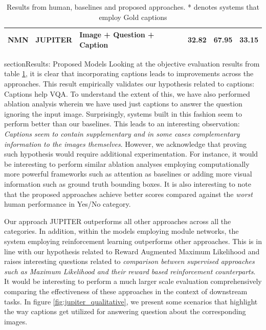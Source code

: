 \begin{table}[!h]
\begin{tabular}{@{}lllccc@{}}
NMN & JUPITER     & Image + Question + Caption &  32.82                 &       	67.95	            &      33.15                   \\\bottomrule
\end{tabular}
\caption{Results from human, baselines and proposed approaches. * denotes systems that employ Gold captions}
\label{results_table}
\end{table}

section{Results: Proposed Models}
Looking at the objective evaluation results from table \ref{results_table}, it is clear that incorporating captions leads to improvements across the approaches. This result empirically validates our hypothesis related to captions: Captions help VQA. To understand the extent of this, we have also performed ablation analysis wherein we have used just captions to answer the question ignoring the input image. Surprisingly, systems built in this fashion seem to perform better than our baselines. This leads to an interesting observation: \textit{Captions seem to contain supplementary and in some cases complementary information to the images themselves}. However, we acknowledge that proving such hypothesis would require additional experimentation. For instance, it would be interesting to perform similar ablation analyses employing computationally more powerful frameworks such as attention as baselines or adding more visual information such as ground truth bounding boxes. It is also interesting to note that the proposed approaches achieve better scores compared against the \textit{worst} human performance in Yes/No category.

Our approach JUPITER outperforms all other approaches across all the categories. In addition, within the models employing module networks, the system employing reinforcement learning outperforms other approaches. This is in line with our hypothesis related to Reward Augmented Maximum Likelihood and raises interesting questions related to \textit{comparison between supervised approaches such as Maximum Likelihood and their reward based reinforcement counterparts}. It would be interesting to perform a much larger scale evaluation comprehensively comparing the effectiveness of these approaches in the context of downstream tasks. In figure \ref{fig:jupiter_qualitative}, we present some scenarios that highlight the way captions get utilized for answering question about the corresponding images.





